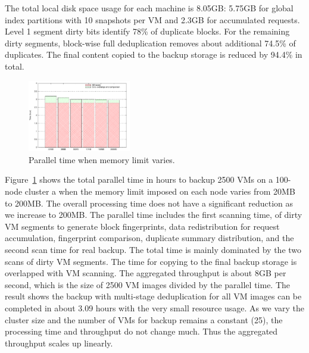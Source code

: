 
%



The total local disk space usage for each machine is 8.05GB:  5.75GB for global index partitions with 10 snapshots per VM
and 2.3GB for accumulated requests.
Level 1 segment dirty bits identify 78\% of duplicate blocks. For the remaining dirty segments,
block-wise full deduplication removes about additional 74.5\% of duplicates.
The final content copied to the backup storage is reduced by 94.4\% in total.

\begin{figure}
\centering
\includegraphics[width=0.4\textwidth]{mem_time.pdf}
\caption{ Parallel time when memory limit varies.}
\label{fig:memory}
\end{figure}

Figure~\ref{fig:memory} shows the total parallel time in hours to backup 2500 VMs on
 a 100-node cluster a  when 
the memory limit imposed on each node varies  from 20MB to 200MB.
The overall processing time does not have a significant reduction as we increase to 200MB.
The parallel time includes the first scanning time, 
of dirty VM segments to generate block fingerprints, data redistribution for request accumulation,
fingerprint comparison, duplicate summary distribution, and the second scan time for real backup.
The total time is mainly dominated by  the two scans of dirty VM segments.
The time for copying to the final backup storage is overlapped with VM scanning.
The aggregated throughput is  about 8GB per second,
which is the size of 2500 VM images divided by the parallel time. 
The result shows the backup with multi-stage deduplication  for all VM images can be 
completed in about 3.09 hours with the very small resource usage.
As we vary the cluster size and the number of VMs for backup remains a constant (25),
the processing time and throughput do not change much. Thus the aggregated throughput
scales up linearly.

